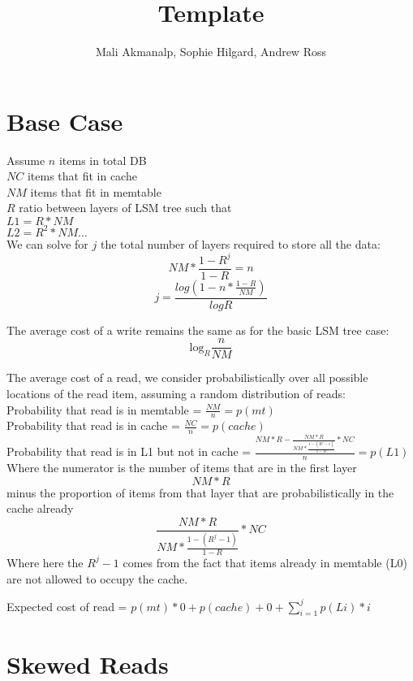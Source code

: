 \documentclass[11pt]{article}
\theoremstyle{plain}
\theoremstyle{definition}
\begin{document}
 


\title{Template}
\author{Mali Akmanalp, Sophie Hilgard, Andrew Ross}
\maketitle

\section{Base Case}

Assume
$n$ items in total DB \\
$NC$ items that fit in cache\\
$NM$ items that fit in memtable\\
$R$ ratio between layers of LSM tree such that \\
$L1 = R * NM$ \\
$L2 = R^2 * NM \dots$ \\ 

We can solve for $j$ the total number of layers required to store all the data: \\
$$NM * \frac{1-R^j}{1-R} = n$$
$$j = \frac{log(1-n*\frac{1-R}{NM})}{log R}$$

The average cost of a write remains the same as for the basic LSM tree case:
$$
\textrm{log}_{R} \frac{n}{NM}
$$

The average cost of a read, we consider probabilistically over all possible locations of the read item, assuming a random distribution of reads: \\
Probability that read is in memtable = $\frac{NM}{n}  = p(mt)$\\
Probability that read is in cache = $\frac{NC}{n} = p(cache)$ \\
Probability that read is in L1 but not in cache = $ \frac{NM * R - \frac{NM * R}{NM * \frac{1-(R^j-1)}{1-R}} * NC}{n}  = p(L1)$\\
Where the numerator is the number of items that are in the first layer $$NM * R$$ minus the proportion of items from that layer that are probabilistically in the cache already $$\frac{NM * R}{NM * \frac{1-(R^j-1)}{1-R}} * NC$$
Where here the $R^j -1$ comes from the fact that items already in memtable (L0) are not allowed to occupy the cache.

Expected cost of read = $p(mt) * 0  + p(cache) + 0 + \sum_{i=1}^j p(Li) * i$

\section{Skewed Reads}
\end{document}
